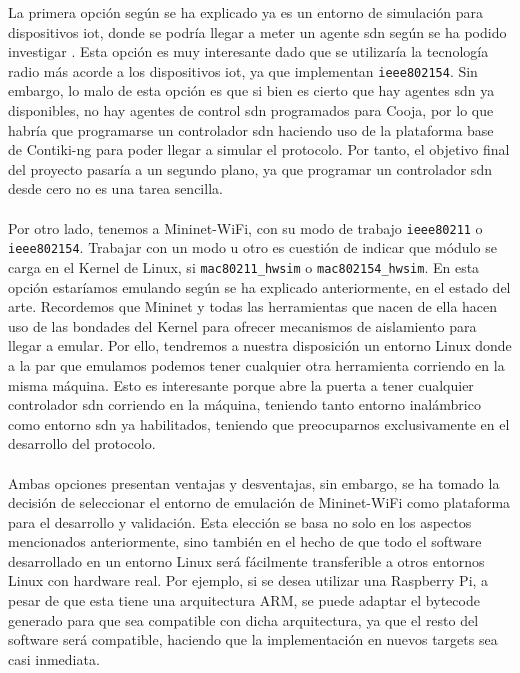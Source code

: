 La primera opción según se ha explicado ya es un entorno de simulación para dispositivos \gls{iot}, donde se podría llegar a meter un agente \gls{sdn} según se ha podido investigar \cite{baddeley2018evolving, Anadiotis:2019}. Esta opción es muy interesante dado que se utilizaría la tecnología radio más acorde a los dispositivos \gls{iot}, ya que implementan \texttt{ieee802154}. Sin embargo, lo malo de esta opción es que si bien es cierto que hay agentes \gls{sdn} ya disponibles, no hay agentes de control \gls{sdn} programados para Cooja, por lo que habría que programarse un controlador \gls{sdn} haciendo uso de la plataforma base de Contiki-ng para poder llegar a simular el protocolo. Por tanto, el objetivo final del proyecto pasaría a un segundo plano, ya que programar un controlador \gls{sdn} desde cero no es una tarea sencilla.\\
\\
Por otro lado, tenemos a Mininet-WiFi, con su modo de trabajo \texttt{ieee80211} o \texttt{ieee802154}. Trabajar con un modo u otro es cuestión de indicar que módulo se carga en el Kernel de Linux, si \texttt{mac80211\_hwsim} o \texttt{mac802154\_hwsim}. En esta opción estaríamos emulando según se ha explicado anteriormente, en el estado del arte. Recordemos que Mininet y todas las herramientas que nacen de ella hacen uso de las bondades del Kernel para ofrecer mecanismos de aislamiento para llegar a emular. Por ello, tendremos a nuestra disposición un entorno Linux donde a la par que emulamos podemos tener cualquier otra herramienta corriendo en la misma máquina. Esto es interesante porque abre la puerta a tener cualquier controlador \gls{sdn} corriendo en la máquina, teniendo tanto entorno inalámbrico como entorno \gls{sdn} ya habilitados, teniendo que preocuparnos exclusivamente en el desarrollo del protocolo.\\
\\
Ambas opciones presentan ventajas y desventajas, sin embargo, se ha tomado la decisión de seleccionar el entorno de emulación de Mininet-WiFi como plataforma para el desarrollo y validación. Esta elección se basa no solo en los aspectos mencionados anteriormente, sino también en el hecho de que todo el software desarrollado en un entorno Linux será fácilmente transferible a otros entornos Linux con hardware real. Por ejemplo, si se desea utilizar una Raspberry Pi, a pesar de que esta tiene una arquitectura ARM, se puede adaptar el bytecode generado para que sea compatible con dicha arquitectura, ya que el resto del software será compatible, haciendo que la implementación en nuevos targets sea casi inmediata.
\vspace{1.2cm}